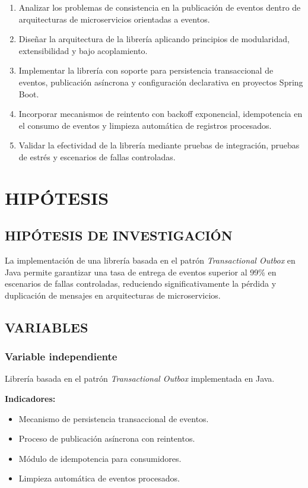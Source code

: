 \begin{enumerate}
    \item Analizar los problemas de consistencia en la publicación de eventos dentro de arquitecturas de microservicios orientadas a eventos.
    \item Diseñar la arquitectura de la librería aplicando principios de modularidad, extensibilidad y bajo acoplamiento.
    \item Implementar la librería con soporte para persistencia transaccional de eventos, publicación asíncrona y configuración declarativa en proyectos Spring Boot.
    \item Incorporar mecanismos de reintento con backoff exponencial, idempotencia en el consumo de eventos y limpieza automática de registros procesados.
    \item Validar la efectividad de la librería mediante pruebas de integración, pruebas de estrés y escenarios de fallas controladas.
\end{enumerate}

\section{HIPÓTESIS}

\subsection{HIPÓTESIS DE INVESTIGACIÓN}

La implementación de una librería basada en el patrón \textit{Transactional Outbox} en Java permite garantizar una tasa de entrega de eventos superior al 99\% en escenarios de fallas controladas, reduciendo significativamente la pérdida y duplicación de mensajes en arquitecturas de microservicios.

\subsection{VARIABLES}

\subsubsection{Variable independiente}

Librería basada en el patrón \textit{Transactional Outbox} implementada en Java.

\textbf{Indicadores:}
\begin{itemize}
    \item Mecanismo de persistencia transaccional de eventos.
    \item Proceso de publicación asíncrona con reintentos.
    \item Módulo de idempotencia para consumidores.
    \item Limpieza automática de eventos procesados.
\end{itemize}

